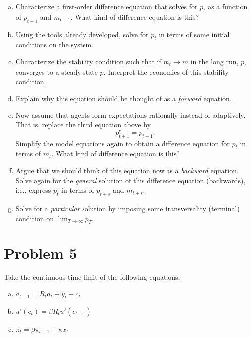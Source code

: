 \documentclass[11pt]{extarticle}
\theoremstyle{plain}
\theoremstyle{definition}
\begin{document}
\begin{enumerate}[(a)]
\item Characterize a first-order difference equation that solves for $p_t$ as a function of $p_{t-1}$ and $m_{t-1}$. What kind of difference equation is this? 

\item Using the tools already developed, solve for $p_t$ in terms of some initial conditions on the system.

\item Characterize the stability condition such that if $m_t \to m$ in the long run, $p_t$ converges to a steady state $p$. Interpret the economics of this stability condition. 

\item Explain why this equation should be thought of as a \textit{forward} equation.

\item Now assume that agents form expectations rationally instead of adaptively. That is, replace the third equation above by 
\begin{equation*}
	p_{t+1}^e = p_{t+1}.
\end{equation*}
Simplify the model equations again to obtain a difference equation for $p_t$ in terms of $m_t$. What kind of difference equation is this?

\item Argue that we should think of this equation now as a \textit{backward} equation. Solve again for the \textit{general} solution of this difference equation (backwards), i.e., express $p_t$ in terms of $p_{t+s}$ and $m_{t+s}$. 

\item Solve for a \textit{particular} solution by imposing some transversality (terminal) condition on $\lim_{T \to \infty} p_T$. 
\end{enumerate}


\vspace{10mm}
\section*{Problem 5}

Take the continuous-time limit of the following equations:
\begin{enumerate}[(a)]
\item $a_{t+1} = R_t a_t + y_t - c_t$

\item $u'(c_t) = \beta R_t u'(c_{t+1})$

\item $\pi_t = \beta \pi_{t+1} + \kappa x_t$
\end{enumerate}
\end{document}
